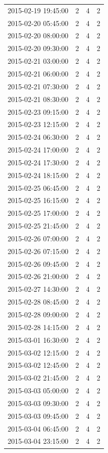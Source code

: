 \begin{tabular}{lrrr}
2015-02-19 19:45:00 & 2 & 4 & 2 \\
2015-02-20 05:45:00 & 2 & 4 & 2 \\
2015-02-20 08:00:00 & 2 & 4 & 2 \\
2015-02-20 09:30:00 & 2 & 4 & 2 \\
2015-02-21 03:00:00 & 2 & 4 & 2 \\
2015-02-21 06:00:00 & 2 & 4 & 2 \\
2015-02-21 07:30:00 & 2 & 4 & 2 \\
2015-02-21 08:30:00 & 2 & 4 & 2 \\
2015-02-23 09:15:00 & 2 & 4 & 2 \\
2015-02-23 12:15:00 & 2 & 4 & 2 \\
2015-02-24 06:30:00 & 2 & 4 & 2 \\
2015-02-24 17:00:00 & 2 & 4 & 2 \\
2015-02-24 17:30:00 & 2 & 4 & 2 \\
2015-02-24 18:15:00 & 2 & 4 & 2 \\
2015-02-25 06:45:00 & 2 & 4 & 2 \\
2015-02-25 16:15:00 & 2 & 4 & 2 \\
2015-02-25 17:00:00 & 2 & 4 & 2 \\
2015-02-25 21:45:00 & 2 & 4 & 2 \\
2015-02-26 07:00:00 & 2 & 4 & 2 \\
2015-02-26 07:15:00 & 2 & 4 & 2 \\
2015-02-26 09:45:00 & 2 & 4 & 2 \\
2015-02-26 21:00:00 & 2 & 4 & 2 \\
2015-02-27 14:30:00 & 2 & 4 & 2 \\
2015-02-28 08:45:00 & 2 & 4 & 2 \\
2015-02-28 09:00:00 & 2 & 4 & 2 \\
2015-02-28 14:15:00 & 2 & 4 & 2 \\
2015-03-01 16:30:00 & 2 & 4 & 2 \\
2015-03-02 12:15:00 & 2 & 4 & 2 \\
2015-03-02 12:45:00 & 2 & 4 & 2 \\
2015-03-02 21:45:00 & 2 & 4 & 2 \\
2015-03-03 05:00:00 & 2 & 4 & 2 \\
2015-03-03 09:30:00 & 2 & 4 & 2 \\
2015-03-03 09:45:00 & 2 & 4 & 2 \\
2015-03-04 06:45:00 & 2 & 4 & 2 \\
2015-03-04 23:15:00 & 2 & 4 & 2 \\

\end{tabular}
